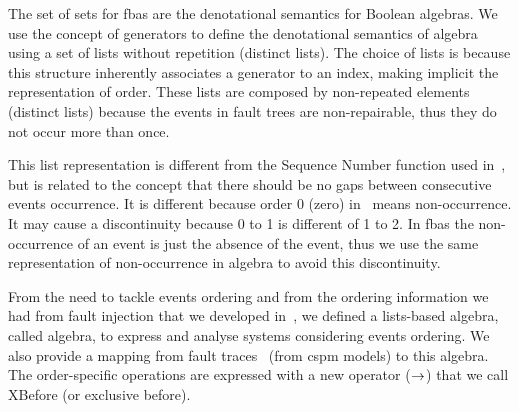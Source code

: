 \documentclass[en,twoside,onehalfspacing,phd]{risethesis}
\def\xbeforeop{\ensuremath\rightarrow}
\begin{document}
The set of sets for \acp{fba} are the denotational semantics for Boolean algebras.
We use the concept of generators to define the denotational semantics of \ac{algebra} using a set of lists without repetition (distinct lists).
The choice of lists is because this structure inherently associates a generator to an index, making implicit the representation of order.
These lists are composed by non-repeated elements (distinct lists) because the events in fault trees are non-repairable, thus they do not occur more than once.

This list representation is different from the Sequence Number function used in~\cite{WP2009,Walker2009}, but is related to the concept that there should be no gaps between consecutive events occurrence.
It is different because order 0 (zero) in~\cite{WP2009,Walker2009} means non-occurrence.
It may cause a discontinuity because 0 to 1 is different of 1 to 2.
In \acp{fba} the non-occurrence of an event is just the absence of the event, thus we use the same representation of non-occurrence in \ac{algebra} to avoid this discontinuity.




From the need to tackle events ordering and from the ordering information we had from fault injection that we developed in~\cite{DM2012}, we defined a lists-based algebra, called \ac{algebra}, to express and analyse systems considering events ordering.
We also provide a mapping from fault traces~\cite{DM2012} (from \ac{cspm} models) to this algebra.
The order-specific operations are expressed with a new operator ($\xbeforeop$) that we call XBefore (or exclusive before).

\end{document}
